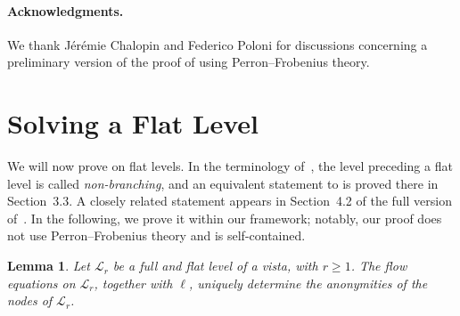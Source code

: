 \documentclass[11pt]{article}
\newtheorem{lemma}{Lemma}
\begin{document}
\paragraph{Acknowledgments.}
We thank J\'er\'emie Chalopin and Federico Poloni for discussions concerning a preliminary version of the proof of  using Perron--Frobenius theory.

\appendix

\section{Solving a Flat Level}
\label{app:flat-anonymities}

We will now prove  on flat levels. In the terminology of~\cite{VIG24}, the level preceding a flat level is called
\emph{non-branching}, and an equivalent statement to
is proved there in Section~3.3.  A closely related statement appears in
Section~4.2 of the full version of~\cite{CBLM24}.
In the following, we prove it within our framework; notably, our proof does not use Perron--Frobenius theory and is self-contained.

\begingroup
\edef\savedflatlevellemmacounter{\number\value{lemma}}
\setcounter{lemma}{0}
\begin{NoHyper}
\begin{lemma}
Let \(\mathcal L_r\) be a full and flat level of a vista, with
\(r\geq1\).  The flow equations on \(\mathcal L_r\), together with \(\ell\),
uniquely determine the anonymities of the nodes of \(\mathcal L_r\).
\end{lemma}
\end{NoHyper}
\setcounter{lemma}{\savedflatlevellemmacounter}
\endgroup
\end{document}
